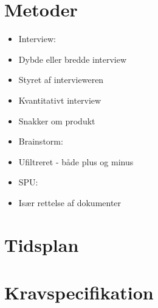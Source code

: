 \documentclass{report}
\begin{document}
\section{Metoder}
\begin{itemize}
\item Interview:
\item Dybde eller bredde interview
\item Styret af intervieweren
\item Kvantitativt interview
\item Snakker om produkt

\item Brainstorm:
\item Ufiltreret - både plus og minus

\item SPU:
\item Især rettelse af dokumenter
\end{itemize}
\section{Tidsplan}

\section{Kravspecifikation}
\end{document}
